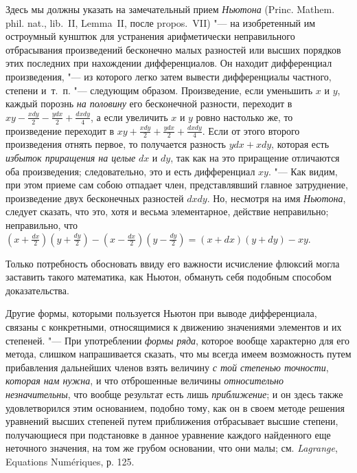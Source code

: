 Здесь мы должны указать на замечательный прием {\em Ньютона}
(Princ. Mathem. phil. nat., lib.~II, Lemma~II, после propos.~VII)
"--- на изобретенный им остроумный кунштюк для устранения арифметически
неправильного отбрасывания произведений бесконечно малых разностей или
высших порядков этих последних при нахождении дифференциалов. Он находит
дифференциал произведения, "--- из которого легко затем вывести дифференциалы
частного, степени и~т.~п. "--- следующим образом. Произведение, если уменьшить
$x$ и $y$, каждый порознь
{\em на половину} его бесконечной разности, переходит в
$xy - \frac {xdy} 2 - \frac {ydx} 2 + \frac {dxdy} 4$,
а если увеличить $x$ и $y$ ровно настолько же, то произведение
переходит в $xy + \frac {xdy} 2 + \frac {ydx} 2 + \frac {dxdy} 4$.
Если от этого второго произведения отнять первое, то получается
разность $ydx + xdy$, которая есть {\em избыток приращения на целые}
$dx$ и $dy$, так как на это
приращение отличаются оба произведения; следовательно, это и есть
дифференциал $xy$. "--- Как видим, при этом приеме сам собою
отпадает член, представлявший главное затруднение, произведение двух
бесконечных разностей $dxdy$. Но, несмотря на имя
{\em Ньютона}, следует сказать, что это, хотя и весьма
элементарное, действие неправильно; неправильно, что 
$\left(x+\frac{dx} 2\right)\left(y+\frac{dy}
2\right)-\left(x-\frac{dx} 2\right)\left(y-\frac{dy}
2\right)=\left(x+dx\right)\left(y+dy\right)-xy$.

Только потребность обосновать ввиду его важности исчисление флюксий могла
заставить такого математика, как Ньютон, обмануть себя подобным способом
доказательства.

Другие формы, которыми пользуется Ньютон при выводе дифференциала, связаны с
конкретными, относящимися к движению значениями элементов и их степеней. "---
При употреблении {\em формы ряда}, которое вообще
характерно для его метода, слишком напрашивается сказать, что мы всегда
имеем возможность путем прибавления дальнейших членов взять величину
{\em с той степенью точности},
{\em которая нам нужна}, и что отброшенные величины
{\em относительно незначительны}, что вообще результат
есть лишь {\em приближение}; и он здесь также
удовлетворился этим основанием, подобно тому, как он в своем методе решения
уравнений высших степеней путем приближения отбрасывает высшие степени,
получающиеся при подстановке в данное уравнение каждого найденного еще
неточного значения, на том же грубом основании, что они малы; см.
{\em Lagrange}, Equations Numériques, р. 125.

